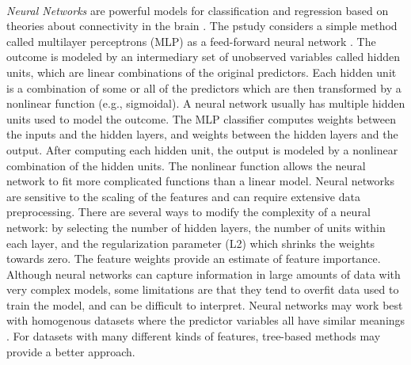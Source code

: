 \\\documentclass[sigconf]{acmart}
\begin{document}
\emph{Neural Networks} are powerful models for classification and 
regression based on theories about connectivity in the brain \cite{kuhn13}. 
The pstudy considers a simple method called multilayer perceptrons 
(MLP) as a feed-forward neural network \cite{muller17, raschka17}. 
The outcome is modeled by an intermediary set of unobserved variables called 
hidden units, which are linear combinations of the original predictors. 
Each hidden unit is a combination of some or all of the predictors which 
are then transformed by a nonlinear function (e.g., sigmoidal). A neural 
network usually has multiple hidden units used to model the outcome. 
The MLP classifier computes weights between the inputs and the hidden layers, 
and weights between the hidden layers and the output. After computing each 
hidden unit, the output is modeled by a nonlinear combination of the hidden 
units. The nonlinear function allows the neural network to fit more 
complicated functions than a linear model. Neural networks are sensitive to 
the scaling of the features and can require extensive data preprocessing. 
There are several ways to modify the complexity of a neural network: by 
selecting the number of hidden layers, the number of units within each 
layer, and the regularization parameter (L2) which shrinks the weights 
towards zero. The feature weights provide an estimate of feature importance.
Although neural networks can capture information in large amounts of data 
with very complex models, some limitations are that they tend to overfit 
data used to train the model, and can be difficult to interpret. Neural
networks may work best with homogenous datasets where the predictor variables
all have similar meanings \cite{muhuri13}. For datasets with many different
kinds of features, tree-based methods may provide a better approach.

\end{document}
